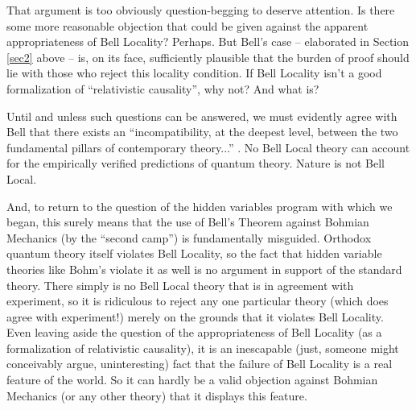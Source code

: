 \documentclass[aps,prc,onecolumn,12pt]{revtex4-2}
\begin{document}
That argument is too obviously question-begging
to deserve attention.
Is there some more reasonable objection that could be given against
the apparent appropriateness of Bell Locality?  Perhaps.  But
Bell's case -- elaborated in Section \ref{sec2} above -- is, on its face,
sufficiently plausible that the burden of proof should lie with those
who reject this locality condition.  If Bell Locality isn't a good
formalization of ``relativistic causality'', why not?  And what is?

Until and unless such questions can be answered, we must evidently
agree with Bell that there exists an ``incompatibility, at the deepest
level, between the two fundamental pillars of contemporary theory...''
\cite[pg 172]{bell}.  No Bell Local theory can account for the
empirically verified predictions of quantum theory.  Nature
is not Bell Local.

And, to return to the question of the hidden
variables program with which we began, this surely means that the
use of Bell's Theorem against Bohmian Mechanics (by the ``second
camp'') is fundamentally misguided.  Orthodox quantum theory
itself violates Bell Locality, so the fact that hidden variable
theories like Bohm's violate it as well is no argument in support
of the standard theory.  There simply is no Bell Local theory that is
in agreement with experiment, so it is ridiculous to reject any one
particular theory (which does agree with experiment!) merely on the
grounds that it violates Bell Locality.
Even leaving aside
the question of the appropriateness of Bell Locality (as a
formalization of relativistic causality), it is an inescapable (just,
someone might conceivably argue, uninteresting) fact that the
failure of Bell Locality is a
real feature of the world.  So it can hardly be a valid objection
against Bohmian Mechanics (or any other theory)
that it displays this feature.
\end{document}

